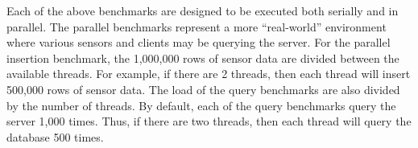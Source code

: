 \documentclass{sig-alternate}
\begin{document}
Each of the above benchmarks are designed to be executed both serially and in parallel.  The parallel benchmarks represent a more ``real-world'' environment where various sensors and clients may be querying the server.  For the parallel insertion benchmark, the 1,000,000 rows of sensor data are divided between the available threads.  For example, if there are 2 threads, then each thread will insert 500,000 rows of sensor data.  The load of the query benchmarks are also divided by the number of threads.  By default, each of the query benchmarks query the server 1,000 times.  Thus, if there are two threads, then each thread will query the database 500 times.

\begin{figure}
	\centering
	\hspace{1cm}
	\hspace{1cm}
	\hspace{1cm}

\end{figure}
\end{document}
